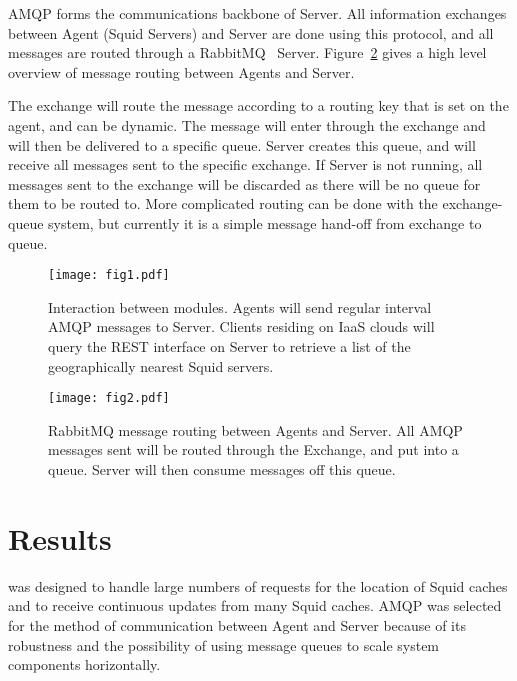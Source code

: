 \documentclass[a4paper]{jpconf}
\begin{document}
AMQP forms the communications backbone of \shoal Server. 
All information exchanges between \shoal Agent (Squid Servers) and \shoal Server are done 
using this protocol, and all messages are routed through a RabbitMQ~\cite{ref:rabbitmq} Server. 
Figure~\ref{rabbitmq-flowchart} gives a high level overview of message routing between 
\shoal Agents and \shoal Server.

The exchange will route the message according to a routing key that is set on the agent, 
and can be dynamic. 
The message will enter through the exchange and will then be delivered to a specific queue. 
\shoal Server creates this queue, and will receive all messages sent to the specific exchange. 
If \shoal Server is not running, all messages sent to the exchange will be discarded as there 
will be no queue for them to be routed to. 
More complicated routing can be done with the exchange-queue system, but currently it is a 
simple message hand-off from exchange to queue.



\begin{figure}[t]
\begin{center}
\texttt{[image: fig1.pdf]}
\caption{Interaction between \shoal modules. \shoal Agents will send regular interval 
AMQP messages to \shoal Server. 
\shoal Clients residing on IaaS clouds will query the REST interface on \shoal Server to 
retrieve a list of the geographically nearest Squid servers.}
\label{shoal-image}
\end{center}
\end{figure}



\begin{figure}
\begin{center}
\texttt{[image: fig2.pdf]}
\caption{RabbitMQ message routing between \shoal Agents and \shoal Server. 
All AMQP~\cite{ref:amqp} messages sent will be routed through the Exchange, and put 
into a queue. \shoal Server will then consume messages off this queue.}
\label{rabbitmq-flowchart}
\end{center}
\end{figure}


\section{Results}

\shoal was designed to handle large numbers of requests for the location of Squid caches
and to receive continuous updates from many Squid caches. 
AMQP was selected for the method of communication between \shoal Agent and \shoal Server 
because of its robustness and the possibility of using message queues to scale system 
components horizontally. 
\end{document}
